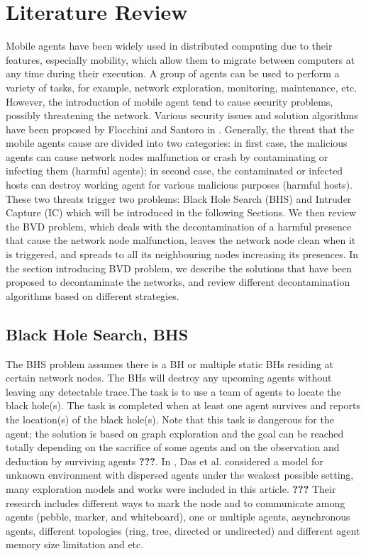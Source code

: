\chapter {Literature Review}
\label{RW}
Mobile agents have been widely used in  distributed computing due to their features, especially   mobility, which allow them to migrate between computers at any time during their execution. A group of agents can be used to perform a variety of tasks, for example, network exploration, monitoring,  maintenance,   etc. However, the introduction of mobile agent tend to cause security problems, possibly  threatening the network. Various security issues and solution algorithms have been proposed by Flocchini and Santoro in \cite{security}. Generally, the threat  that the mobile agents cause are divided into two categories: in first case, the malicious agents can cause network nodes malfunction or crash by contaminating or infecting them (harmful agents); in second case, the contaminated or infected hosts can destroy working agent for various malicious purposes (harmful hosts). These two threats trigger two problems: Black Hole Search (BHS) and Intruder Capture (IC) which will be introduced in the following Sections. We then  review the BVD problem, which deals with the decontamination of a harmful presence that cause the network node malfunction, leaves the network node clean when it is triggered, and spreads to all its neighbouring nodes increasing its presences. In the section introducing BVD problem, we describe the solutions that have been proposed to decontaminate the networks, and review different decontamination algorithms based on different strategies.

\section{Black Hole Search, BHS}
The BHS problem assumes there is a BH or multiple static BHs residing at certain network nodes. The BHs will destroy any upcoming agents without leaving any detectable trace.The task is to use a team of agents to locate the black hole(s). The task is completed when at least one agent survives and reports the location(s) of the black hole(s). Note that this task is dangerous for the agent;  the solution is based on graph exploration and the goal can be reached totally depending on the sacrifice of some agents and on the observation and deduction by surviving agents {\bf ???}.  In \cite{Das}, Das et al. considered a model for unknown environment with dispersed agents under the weakest possible setting, many exploration models and works were included in this article. {\bf ???} Their research includes different ways to mark the node and to communicate among agents (pebble, marker, and whiteboard), one or multiple agents, asynchronous agents, different topologies (ring, tree, directed or undirected) and different agent memory size limitation and etc.

